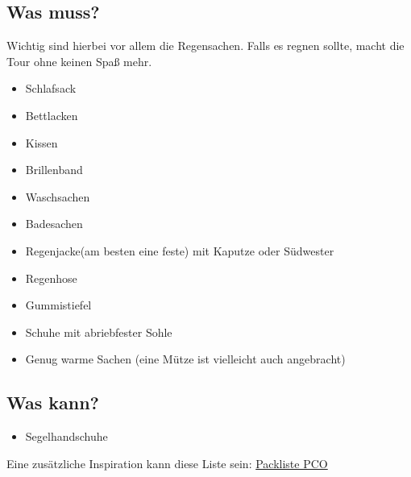 \documentclass[12pt]{article}
\begin{document}
\subsection*{Was muss?}
Wichtig sind hierbei vor allem die Regensachen. Falls es regnen sollte, macht die Tour ohne keinen Spaß mehr.
\begin{itemize}
\renewcommand{\labelitemi}{$\boxempty$}
\item Schlafsack
\item Bettlacken
\item Kissen
\item Brillenband
\item Waschsachen
\item Badesachen
\item Regenjacke(am besten eine feste) mit Kaputze oder Südwester
\item Regenhose
\item Gummistiefel
\item Schuhe mit abriebfester Sohle
\item Genug warme Sachen (eine Mütze ist vielleicht auch angebracht)
\end{itemize}

\subsection*{Was kann?}
\begin{itemize}
\renewcommand{\labelitemi}{$\boxempty$}
\item Segelhandschuhe

\end{itemize}

Eine zusätzliche Inspiration kann diese Liste sein: \href{http://www.pc-ostsee.de/yachtcharter/sites/download/Packliste.pdf}{Packliste PCO}

\end{document}
